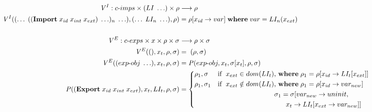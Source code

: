 \documentclass[sigplan,screen,anonymous]{acmart}
\def\dash {\text{-}}
\begin{document}
\newcommand{\runio}[1]{run\dash prog(#1, \rho, \sigma)\;}
\newcommand{\prog}[2]{(\textbf{program}\; (\textbf{use\dash linklets}\;#1 )\;#2)}
\def\transrel {&\twoheadrightarrow_{p}\;}

\begin{figure*}[tbp]
  \begin{align*}
    \mathit{V}^I : c\dash imps \times (LI\;\ldots) \times \rho &\longrightarrow \rho \\
    \mathit{V}^I((\ldots\;((\textbf{Import}\; x_{id}\;x_{int}\;x_{ext})\;\ldots)_n\;\ldots), (\ldots\;LI_n\;\ldots), \rho) &= \rho[x_{id}\rightarrow var]\; \where var = LI_n(x_{ext}) \\ \\
    \mathit{V}^E : c\dash exps \times x \times \rho \times \sigma &\longrightarrow \rho \times \sigma \\
    \mathit{V}^E((), x_t, \rho, \sigma) &=\; (\rho, \sigma) \\
    \mathit{V}^E((exp\dash obj\;\ldots), x_t, \rho, \sigma) &= \mathit{P}(exp\dash obj, x_t, \sigma[x_t], \rho, \sigma)\\
    \mathit{P}((\textbf{Export}\;x_{id}\;x_{int}\;x_{ext}), x_t, LI_t, \rho, \sigma) &= \begin{cases*}
      \rho_1, \sigma & if $\;x_{ext} \in dom(LI_t)$, \where $\rho_1 = \rho[x_{id}\rightarrow LI_t[x_{ext}]]$ \\
      \rho_1, \sigma_1 & if $\;x_{ext} \notin dom(LI_t)$, \where $\rho_1 = \rho[x_{id}\rightarrow var_{new}]$\\
      \;        &\; \hspace{2.6cm} $\sigma_1 = \sigma[var_{new}\rightarrow uninit,$ \\
      \;        &\; \hspace{3.2cm} $x_t\rightarrow LI_t[x_{ext}\rightarrow var_{new}]]$

\end{cases*}
\end{align*}
\end{figure*}
\end{document}
